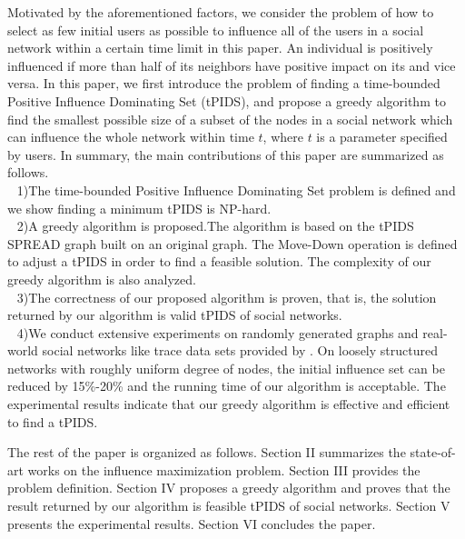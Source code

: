Motivated by the aforementioned factors, we consider the problem of how to select as few initial users as possible to influence all of the users
in a social network within a certain time limit in this paper.
An individual is positively influenced if more than half of its neighbors have positive impact on its and vice versa.
In this paper, we first introduce the problem of finding a time-bounded Positive Influence Dominating Set (tPIDS), and propose a greedy algorithm to find the smallest possible size of a subset of the nodes in a social network which can
influence the whole network within time $t$, where $t$ is a parameter specified by users.
In summary, the main contributions of this paper are summarized as follows.\\
$~~$ 1)The time-bounded Positive Influence Dominating Set problem is defined and we show finding a minimum tPIDS is NP-hard.\\
$~~$ 2)A greedy algorithm is proposed.The algorithm is based on the tPIDS SPREAD graph built on an original graph.
The Move-Down operation is defined to adjust a tPIDS in order to find a feasible solution.
The complexity of our greedy algorithm is also analyzed.\\
$~~$ 3)The correctness of our proposed algorithm is proven, that is, the solution returned by our algorithm is valid tPIDS of social networks.\\
$~~$ 4)We conduct extensive experiments on randomly generated graphs and real-world social networks like trace data sets provided by \cite{sju}. On loosely structured networks with roughly uniform degree of nodes, the initial influence set can be reduced by 15\%-20\% and the running time of our algorithm is acceptable. The experimental results indicate that our greedy algorithm is effective and efficient to find a tPIDS.

The rest of the paper is organized as follows.
Section II summarizes the state-of-art works on the influence maximization problem.
Section III provides the problem definition.
Section IV proposes a greedy algorithm and proves that the result returned by our algorithm is feasible tPIDS of social networks.
Section V presents the experimental results.
Section VI concludes the paper.
